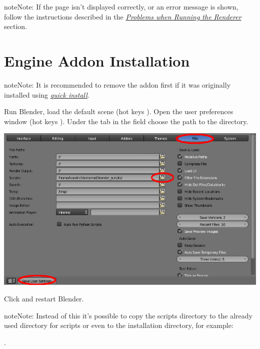 \documentclass[a4paper,12pt,oneside]{sphinxmanual}
\begin{document}
\begin{DUlineblock}{0em}
\item[] 
\end{DUlineblock}

\begin{notice}{note}{Note:}
If the page isn't displayed correctly, or an error message is shown, follow the instructions described in the {\hyperref[problems_and_solutions:renderer-not-working]{\emph{Problems when Running the Renderer}}} section.
\end{notice}


\section{Engine Addon Installation}
\label{setup:getting-started-addon}\label{setup:id7}\label{setup:index-2}
\begin{notice}{note}{Note:}
It is recommended to remove the addon first if it was originally installed using {\hyperref[first_steps:quick-install]{\emph{quick install}}}.
\end{notice}

Run Blender, load the default scene  (hot keys ). Open the user preferences window  (hot keys ). Under the  tab in the  field choose the path to the  directory.

{\hfill\includegraphics[width=1.000\linewidth]{user_preferences_scripts_path.jpg}\hfill}

Click  and restart Blender.

\begin{notice}{note}{Note:}
Instead of this it's possible to copy the scripts directory  to the already used directory for scripts or even to the installation directory, for example:

.
\end{notice}
\end{document}

